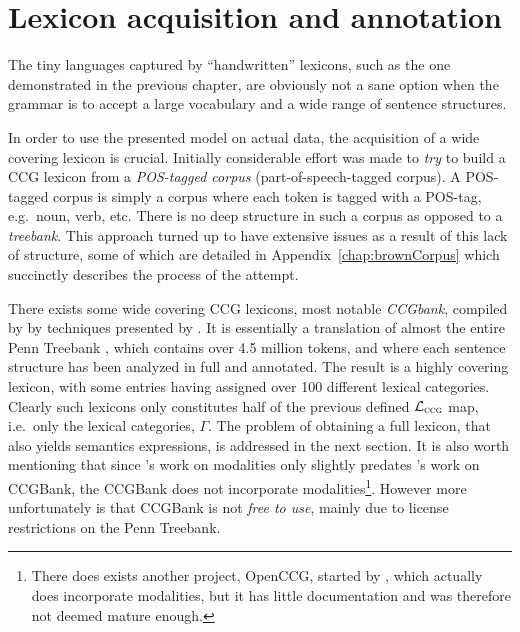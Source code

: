 
\chapter{Lexicon acquisition and annotation}
\label{chap:lexiconAcquisition}
The tiny languages captured by ``handwritten'' lexicons, such as the one demonstrated in the previous chapter, are obviously not a sane option when the grammar is to accept a large vocabulary and a wide range of sentence structures.

In order to use the presented model on actual data, the acquisition of a wide covering lexicon is crucial. Initially considerable effort was made to \emph{try} to build a CCG lexicon from a \emph{POS-tagged corpus} (part-of-speech-tagged corpus). A POS-tagged corpus is simply a corpus where each token is tagged with a POS-tag, e.g.\ noun, verb, etc. There is no deep structure in such a corpus as opposed to a \emph{treebank}. This approach turned up to have extensive issues as a result of this lack of structure, some of which are detailed in Appendix~\ref{chap:brownCorpus} which succinctly describes the process of the attempt.

There exists some wide covering CCG lexicons, most notable \emph{CCGbank}, compiled by \citeauthor{ccgBank}  by techniques presented by \cite{juliaThesis}. It is essentially a translation of almost the entire Penn Treebank \cite{pennTreebank}, which contains over 4.5 million tokens, and where each sentence structure has been analyzed in full and annotated. The result is a highly covering lexicon, with some entries having assigned over 100 different lexical categories. Clearly such lexicons only constitutes half of the previous defined $\mathcal{L}_\textsc{ccg}$ map, i.e.\ only the lexical categories, $\Gamma$. The problem of obtaining a full lexicon, that also yields semantics expressions, is addressed in the next section. It is also worth mentioning that since \citeauthor{baldridgeThesis}'s  work on modalities only slightly predates \citeauthor{juliaThesis}'s  work on CCGBank, the CCGBank does not incorporate modalities\footnote{There does exists another project, OpenCCG, started by \citeauthor{baldridgeThesis}, which actually does incorporate modalities, but it has little documentation and was therefore not deemed mature enough.}. However more unfortunately is that CCGBank is not \emph{free to use}, mainly due to license restrictions on the Penn Treebank.%

